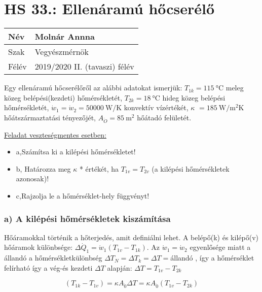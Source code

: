 		
\section*{HS 33.: Ellenáramú hőcserélő}	

\begin{tabular}{ | p{2cm} | p{14cm} | } 
	\hline
	Név & Molnár Annna \\ 
	\hline
	Szak & Vegyészmérnök \\ 
	\hline
	Félév & 2019/2020 II. (tavaszi) félév \\ 
	\hline
\end{tabular}
\vspace{0.5cm}

\noindent
 Egy ellenáramú hőcserélőről az alábbi adatokat ismerjük:
$T_{1k} = \SI{115}{\celsius}$ meleg közeg belépési(kezdeti) hőmérsékletét,
$T_{2k} = \SI{18}{\celsius}$ hideg közeg belépési hőmérsékletét,
$\dot{w}_1 = \dot{w}_2 =\SI{50000}{\watt\per\kelvin}$ konvektív vízértékét,
$\kappa$ $= \SI{185}{\watt\per\meter\squared\kelvin}$ hőátszármaztatási tényezőjét,
$A_{\ddot{O}} = \SI{85}{\meter\squared}$ hőátadó felületét.
\vspace{5mm}

\underline{Feladat veszteségmentes esetben:}
\begin{itemize}
\item a,Számítsa ki a kilépési hőmérsékletet! 
\item b, Határozza meg $\kappa$ * értékét, ha $T_{1v} = T_{2v}$ (a kilépési hőmérsékletek azonosak)!
\item c,Rajzolja le a hőmérséklet-hely függvényt!
\end{itemize}
\vspace{5mm}
\subsubsection*{a) A kilépési hőmérsékletek kiszámítása}

 Hőáramokkal történik a hőterjedés, amit definiálni lehet. A belépő(k) és kilépő(v) hőáramok különbsége: $\Delta \dot{Q}_1 = \dot{w}_1 \left(T_{1v} - T_{1k}\right)$.
 Az $\dot{w}_1 = \dot{w}_2$ egyenlősége miatt a állandó a hőmérsékletkülönbség $\Delta T_N = \Delta T_k = \Delta T = $állandó , így a hőmérséklet felírható így a vég-és kezdeti $\Delta T$ alapján:
 $\Delta T = T_{1v} - T_{2k}$

\begin{equation}
  \left(T_{1k} - T_{1v}\right) = \kappa A_{\ddot{0}} \Delta T = \kappa A_{\ddot{0}} \left(T_{1v} - T_{2k}\right)
 \end{equation}

